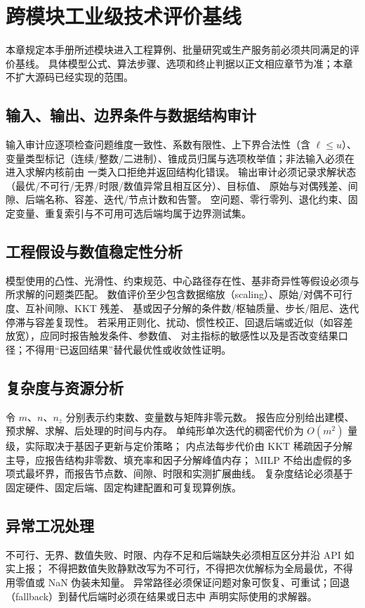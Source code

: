 \section{跨模块工业级技术评价基线}

本章规定本手册所述模块进入工程算例、批量研究或生产服务前必须共同满足的评价基线。
具体模型公式、算法步骤、选项和终止判据以正文相应章节为准；本章不扩大源码已经实现的范围。

\subsection{输入、输出、边界条件与数据结构审计}
输入审计应逐项检查问题维度一致性、系数有限性、上下界合法性（含 $\ell\le u$）、
变量类型标记（连续/整数/二进制）、锥成员归属与选项枚举值；非法输入必须在进入求解内核前由
 一类入口拒绝并返回结构化错误。
输出审计必须记录求解状态（最优/不可行/无界/时限/数值异常且相互区分）、目标值、
原始与对偶残差、间隙、后端名称、容差、迭代/节点计数和告警。
空问题、零行零列、退化约束、固定变量、重复索引与不可用可选后端均属于边界测试集。

\subsection{工程假设与数值稳定性分析}
模型使用的凸性、光滑性、约束规范、中心路径存在性、基非奇异性等假设必须与所求解的问题类匹配。
数值评价至少包含数据缩放（scaling）、原始/对偶不可行度、互补间隙、KKT 残差、
基或因子分解的条件数/枢轴质量、步长/阻尼、迭代停滞与容差复现性。
若采用正则化、扰动、惯性校正、回退后端或近似（如容差放宽），应同时报告触发条件、参数值、
对主指标的敏感性以及是否改变结果口径；不得用``已返回结果''替代最优性或收敛性证明。

\subsection{复杂度与资源分析}
令 $m$、$n$、$n_z$ 分别表示约束数、变量数与矩阵非零元数。
报告应分别给出建模、预求解、求解、后处理的时间与内存。
单纯形单次迭代的稠密代价为 $O(m^2)$ 量级，实际取决于基因子更新与定价策略；
内点法每步代价由 KKT 稀疏因子分解主导，应报告结构非零数、填充率和因子分解峰值内存；
MILP 不给出虚假的多项式最坏界，而报告节点数、间隙、时限和实测扩展曲线。
复杂度结论必须基于固定硬件、固定后端、固定构建配置和可复现算例族。

\subsection{异常工况处理}
不可行、无界、数值失败、时限、内存不足和后端缺失必须相互区分并沿 API 如实上报；
不得把数值失败静默改写为不可行，不得把次优解标为全局最优，不得用零值或 NaN 伪装未知量。
异常路径必须保证问题对象可恢复、可重试；回退（fallback）到替代后端时必须在结果或日志中
声明实际使用的求解器。

